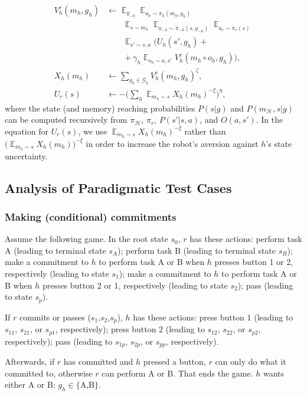 \documentclass[letterpaper]{article} %
\DeclareMathOperator*{\E}{\mathbb{E}}
\def\G{\mathcal{G}}
\def\H{\mathcal{H}}
\begin{document}
\begin{align}
    V^e_h(m_h,g_h) &\gets \textstyle\E_{g_{-h}}\E_{a_h\sim\pi_h(m_h,g_h)} \nonumber\\
        &\qquad\textstyle\E_{s\sim m_h}\E_{a_{-h}\sim\tilde\pi_{-h}(s,g_{-h})}\E_{a_r\sim\tilde\pi_r(s)} \nonumber\\
        &\qquad\textstyle\E_{s'\sim s,a}  \big(U_h(s',g_h) + {} \nonumber\\
        &\qquad\textstyle + \gamma_h \E_{o_h\sim a,s'}V^e_h(m_h\circ o_h,g_h)\big), \nonumber%
        \\
    X_h(m_h) &\gets \textstyle \sum_{g_h\in\G_h} V^e_h(m_h,g_h)^\zeta, \nonumber%
    \\
    U_r(s) &\gets \textstyle -\big(\sum_h\E_{m_h\sim s} X_h(m_h)^{-\xi}\big)^\eta, \nonumber%
\end{align}
where the state (and memory) reaching probabilities $P(s|g)$ and $P(m_\H,s|g)$  can be computed recursively from $\pi_\H$, $\pi_r$, $P(s'|s,a)$, and $O(a,s')$.
In the equation for $U_r(s)$, we use $\E_{m_h\sim s} X_h(m_h)^{-\xi}$ rather than $\big(\E_{m_h\sim s} X_h(m_h)\big)^{-\xi}$ in order to increase the robot's aversion against $h$'s state uncertainty.


\subsection*{Analysis of Paradigmatic Test Cases}

\subsubsection*{Making (conditional) commitments}

Assume the following game.
In the root state $s_0$, $r$ has these actions: 
perform task A (leading to terminal state $s_A$); 
perform task B (leading to terminal state $s_B$);
make a commitment to $h$ to perform task A or B when $h$ presses button 1 or 2, respectively (leading to state $s_1$); 
make a commitment to $h$ to perform task A or B when $h$ presses button 2 or 1, respectively (leading to state $s_2$); 
pass (leading to state $s_p$).

If $r$ commits or passes ($s_1$,$s_2$,$s_p$), $h$ has these actions: 
press button 1 (leading to $s_{11}$, $s_{21}$, or $s_{p1}$, respectively); 
press button 2 (leading to $s_{12}$, $s_{22}$, or $s_{p2}$, respectively); 
pass (leading to $s_{1p}$, $s_{2p}$, or $s_{pp}$, respectively).

Afterwards, if $r$ has committed and $h$ pressed a button, $r$ can only do what it committed to, otherwise $r$ can perform A or B. 
That ends the game.
$h$ wants either A or B: $g_h\in\{$A,B$\}$.
\end{document}
